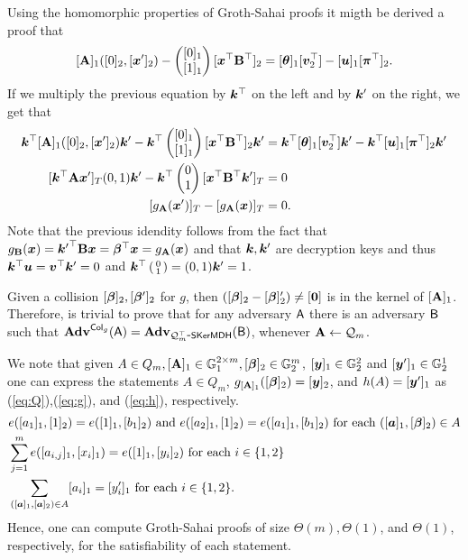  Using the homomorphic properties of Groth-Sahai proofs it migth be derived a proof that
$$
[\mathbf{{A}}]_1([0]_2, [{\boldsymbol{x}}']_2) - \left(\begin{matrix}{[0]_1}\\{[1]_1}\end{matrix}\right)[{\boldsymbol{x}}^\top\mathbf{{B}}^\top]_2=[{\boldsymbol{\theta}}]_1[{\boldsymbol{v}}^\top_2]-[{\boldsymbol{u}}]_1[{\boldsymbol{\pi}}^\top]_2.
$$
If we multiply the previous equation by ${\boldsymbol{k}}^\top$ on the left and by ${\boldsymbol{k}}'$ on the right, we get that
\begin{align*}
\vecb{k}^\top[\matr{A}]_1([0]_2, [\vecb{x}']_2)\vecb{k}' - \vecb{k}^\top\pmatri{{[0]_1}\\{[1]_1}}[\vecb{x}^\top\matr{B}^\top]_2\vecb{k}'
&=
\vecb{k}^\top[\vecb{\theta}]_1[\vecb{v}^\top_2]\vecb{k}'-\vecb{k}^\top[\vecb{u}]_1[\vecb{\pi}^\top]_2\vecb{k}'\\
[\vecb{k}^\top\matr{A}\vecb{x}']_T(0, 1)\vecb{k}' - \vecb{k}^\top\pmatri{0\\1}[\vecb{x}^\top\matr{B}^\top\vecb{k}']_T
&=0\\
[g_\vecb{\matr{A}}(\vecb{x}')]_T - [g_\matr{A}(\vecb{x})]_T &= 0.
\end{align*}
Note that the previous idendity follows from the fact that $g_{\mathbf{{B}}}({\boldsymbol{x}}) = {{\boldsymbol{k}}'}^\top\mathbf{{B}}{\boldsymbol{x}}={\boldsymbol{\beta}}^\top{\boldsymbol{x}}=g_{\mathbf{{A}}}({\boldsymbol{x}})$ and that ${\boldsymbol{k}},{\boldsymbol{k}}'$ are decryption keys and thus ${\boldsymbol{k}}^\top{\boldsymbol{u}}={\boldsymbol{v}}^\top{\boldsymbol{k}}'=0$ and ${\boldsymbol{k}}^\top\left(\begin{smallmatrix}0\\1\end{smallmatrix}\right)=(0,1){\boldsymbol{k}}'=1$.

Given a collision $[{\boldsymbol{\beta}}]_2,[{\boldsymbol{\beta}}']_2$ for $g$, then $([{\boldsymbol{\beta}}]_2-[{\boldsymbol{\beta}}]'_2)\neq [{\boldsymbol{0}}]$ is in the kernel of $[\mathbf{{A}}]_1$. Therefore, is trivial to prove that for any adversary $\mathsf{A}$ there is an adversary $\mathsf{B}$ such that $\mathbf{Adv}^{\mathsf{Col}_g}(\mathsf{A})=\mathbf{Adv}_{\mathcal{Q}_m^\top\mbox{-}\mathsf{SKerMDH}}(\mathsf{B})$, whenever $\mathbf{{A}}\gets\mathcal{Q}_m$.

We note that given $A\in Q_m,[\mathbf{{A}}]_1\in\mathbb{G}^{2\times m}_1,[{\boldsymbol{\beta}}]_2\in\mathbb{G}^m_2$, $[{\boldsymbol{y}}]_1\in\mathbb{G}_2^2$ and $[{\boldsymbol{y}}']_1\in\mathbb{G}^1_2$ one can express the statements $A\in Q_m$, $g_{[\mathbf{{A}}]_1}([{\boldsymbol{\beta}}]_2)=[{\boldsymbol{y}}]_2$, and $h(A)=[{\boldsymbol{y}}']_1$ as (\ref{eq:Q}),(\ref{eq:g}), and (\ref{eq:h}), respectively.
 \begin{align}
&e([a_{1}]_1,[1]_2) = e([1]_1,[{b}_1]_2)\text{ and }e([a_{2}]_1,[1]_2)=e([a_{1}]_1,[b_1]_2)
\text{ for each }([{\boldsymbol{a}}]_1,[{\boldsymbol{\beta}}]_2)\in A \label{eq:Q}\\
&\sum_{j=1}^m e([a_{i,j}]_1,[x_i]_1) = e([1]_1,[y_i]_2) \text{ for each } i\in\{1,2\} \label{eq:g}\\
&\sum_{([{\boldsymbol{a}}]_1,[{\boldsymbol{a}}]_2)\in A} [a_i]_1 = [y'_i]_1 \text{ for each } i\in\{1,2\}.\label{eq:h}
\end{align}
Hence, one can compute Groth-Sahai proofs of size $\Theta(m),\Theta(1)$, and $\Theta(1)$, respectively, for the satisfiability of each statement.

